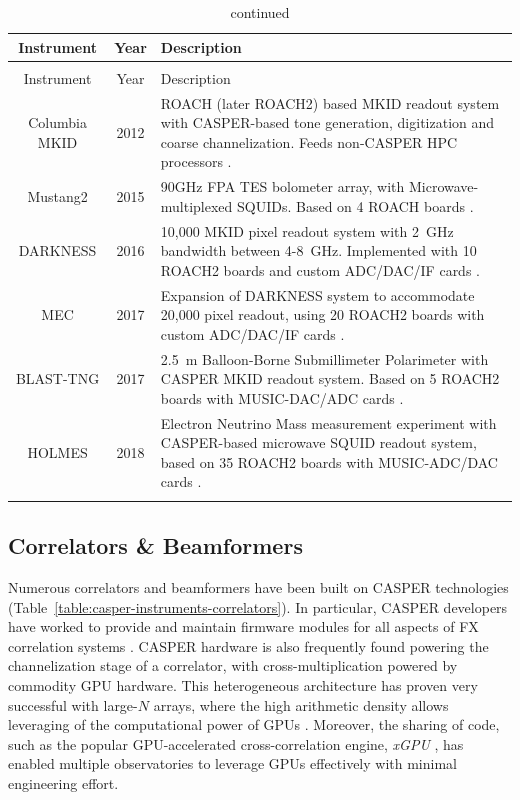 \documentclass{ws-jai}
\begin{document}
\begin{longtable}{ccp{10cm}}
  \caption{MKID readout systems powered by CASPER hardware.}\\
  Instrument & Year & Description \\
  \hline \endfirsthead
  \caption[]{continued}\\
  Instrument & Year & Description \\
  \hline \endhead
  Columbia MKID    & 2012 & ROACH (later ROACH2) based MKID readout system with CASPER-based tone generation, digitization and coarse channelization. Feeds non-CASPER HPC processors \citep{mccarrick_2014}. \\
  Mustang2         & 2015 & 90GHz FPA TES bolometer array, with Microwave-multiplexed SQUIDs. Based on 4 ROACH boards \citep{2016JLTP..184..460S, 2014JLTP..176..808D}.  \\
  DARKNESS         & 2016 & 10,000 MKID pixel readout system with 2~GHz bandwidth between 4-8~GHz. Implemented with 10 ROACH2 boards and custom ADC/DAC/IF cards \citep{meeker2015design}. \\
  MEC              & 2017 & Expansion of DARKNESS system to accommodate 20,000 pixel readout, using 20 ROACH2 boards with custom ADC/DAC/IF cards \citep{meeker2015design}. \\
  BLAST-TNG        & 2017 &  2.5~m Balloon-Borne Submillimeter Polarimeter with CASPER MKID readout system. Based on 5 ROACH2 boards with MUSIC-DAC/ADC cards \citep{galitzki2014balloon}. \\
  HOLMES           & 2018 & Electron Neutrino Mass measurement experiment with CASPER-based microwave SQUID readout system, based on 35 ROACH2 boards with MUSIC-ADC/DAC cards \citep{Alpert2015, Ferri2016179}. \\
  \label{table:casper-instruments-mkids}
\end{longtable}


\subsection{Correlators \& Beamformers}

Numerous correlators and beamformers have been built on CASPER technologies (Table~\ref{table:casper-instruments-correlators}). In particular, CASPER developers have worked to provide and maintain firmware modules for all aspects of FX correlation systems \citep{parsons2008scalable}. CASPER hardware is also frequently found powering the channelization stage of a correlator, with cross-multiplication powered by commodity GPU hardware. This heterogeneous architecture has proven very successful with large-$N$ arrays, where the high arithmetic density allows leveraging of the computational power of GPUs \citep{scalable-gpu-fpga, kocz2015, chime-correlator}. Moreover, the sharing of code, such as the popular GPU-accelerated cross-correlation engine, \emph{xGPU} \citep{xgpu}, has enabled multiple observatories to leverage GPUs effectively with minimal engineering effort.
\end{document}
